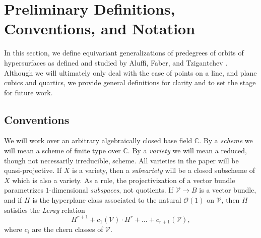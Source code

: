 \documentclass[12 pt, reqno]{amsart}
\theoremstyle{definition}
\newcommand{\mb}{\mathbb}
\renewcommand{\k}{\mathbb{C}}
\begin{document}

\section{Preliminary Definitions, Conventions, and Notation}
\label{sec:definitions}
In this section, we define equivariant generalizations of predegrees
of orbits of hypersurfaces as defined and studied by Aluffi, Faber,
and Tzigantchev \cite{T08,AFpoint,AF93,AF00}. Although we will
ultimately only deal with the case of points on a line, and plane
cubics and quartics, we provide general definitions for clarity and to
set the stage for future work.

\subsection{Conventions}
\label{sec:conventions}

We will work over an arbitrary algebraically closed base field $\k$.
By a {\sl scheme} we will mean a scheme of finite type over $\k$. By a
{\sl variety} we will mean a reduced, though not necessarily
irreducible, scheme. All varieties in the paper will be
quasi-projective.  If $X$ is a variety, then a {\sl subvariety} will
be a closed subscheme of $X$ which is also a variety.  As a rule, the
projectivization of a vector bundle parametrizes $1$-dimensional {\sl
  subspaces}, not quotients.  If $\mathcal{V} \to B$ is a vector
bundle, and if $H$ is the hyperplane class associated to the natural
$\mathcal{O}(1)$ on $\mathcal{V}$, then $H$ satisfies the {\sl Leray}
relation
\[H^{r+1} + c_{1}(\mathcal{V}) \cdot H^{r} + \dots +
  c_{r+1}(\mathcal{V}),\] where $c_{i}$ are the chern classes of
$\mathcal{V}$.
\end{document}
